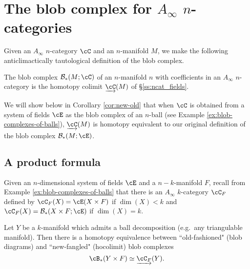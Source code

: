 
\section{The blob complex for \texorpdfstring{$A_\infty$}{A-infinity} \texorpdfstring{$n$}{n}-categories}
\label{sec:ainfblob}
Given an $A_\infty$ $n$-category $\cC$ and an $n$-manifold $M$, we make the following 
anticlimactically tautological definition of the blob
complex.
\begin{defn}
The blob complex
 $\bc_*(M;\cC)$ of an $n$-manifold $n$ with coefficients in an $A_\infty$ $n$-category is the homotopy colimit $\cl{\cC}(M)$ of \S\ref{ss:ncat_fields}.
\end{defn}

We will show below 
in Corollary \ref{cor:new-old}
that when $\cC$ is obtained from a system of fields $\cE$ 
as the blob complex of an $n$-ball (see Example \ref{ex:blob-complexes-of-balls}), 
$\cl{\cC}(M)$ is homotopy equivalent to
our original definition of the blob complex $\bc_*(M;\cE)$.


%

\subsection{A product formula}
\label{ss:product-formula}


Given an $n$-dimensional system of fields $\cE$ and a $n{-}k$-manifold $F$, recall from 
Example \ref{ex:blob-complexes-of-balls} that there is an  $A_\infty$ $k$-category $\cC_F$ 
defined by $\cC_F(X) = \cE(X\times F)$ if $\dim(X) < k$ and
$\cC_F(X) = \bc_*(X\times F;\cE)$ if $\dim(X) = k$.


\begin{thm} \label{thm:product}
Let $Y$ be a $k$-manifold which admits a ball decomposition
(e.g.\ any triangulable manifold).
Then there is a homotopy equivalence between ``old-fashioned" (blob diagrams) 
and ``new-fangled" (hocolimit) blob complexes
\[
	\cB_*(Y \times F) \htpy \cl{\cC_F}(Y) .
\]\end{thm}

